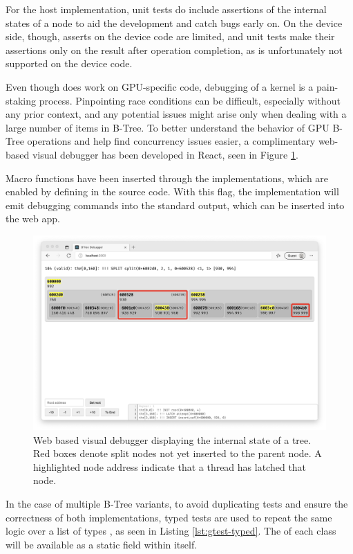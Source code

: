 For the host implementation, unit tests do include assertions of the internal states of a node to aid the development and catch bugs early on. On the device side, though, asserts on the device code are limited, and unit tests make their assertions only on the result after operation completion, as  is unfortunately not supported on the device code.

Even though  does work on GPU-specific code, debugging of a kernel is a pain-staking process. Pinpointing race conditions can be difficult, especially without any prior context, and any potential issues might arise only when dealing with a large number of items in B-Tree. To better understand the behavior of GPU B-Tree operations and help find concurrency issues easier, a complimentary web-based visual debugger has been developed in React, seen in Figure \ref{figure:debugger}.

Macro functions have been inserted through the implementations, which are enabled by defining  in the source code. With this flag, the implementation will emit debugging commands into the standard output, which can be inserted into the web app.

\begin{figure}
  \centering
  \includegraphics[width=\textwidth]{components/figure/debugger.png}
  \caption{Web based visual debugger displaying the internal state of a tree. Red boxes denote split nodes not yet inserted to the parent node. A highlighted node address indicate that a thread has latched that node.}
  \label{figure:debugger}
\end{figure}

In the case of multiple B-Tree variants, to avoid duplicating tests and ensure the correctness of both implementations, typed tests are used to repeat the same logic over a list of types \cite{gtest-advanced}, as seen in Listing \ref{lst:gtest-typed}. The  of each class will be available as a static field within  itself.

